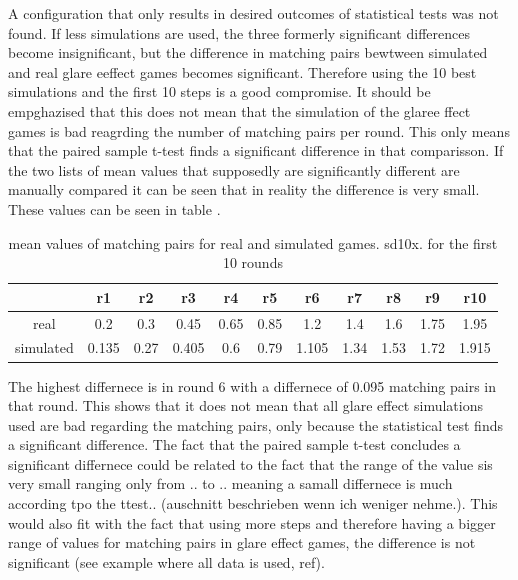 A configuration that only results in desired outcomes of statistical tests was not found. If less simulations are used, the three formerly significant differences become insignificant, but the difference in matching pairs bewtween simulated and real glare eeffect games becomes significant. Therefore using the 10 best simulations and the first 10 steps is a good compromise. It should be empghazised that this does not mean that the simulation of the glaree ffect games is bad reagrding the number of matching pairs per round. This only means that the paired sample t-test finds a significant difference in that comparisson. If the two lists of mean values that supposedly are significantly different are manually compared it can be seen that in reality the difference is very small. These values can be seen in table .

\begin{table}[H]
	\centering
	\caption{mean values of matching pairs for real and simulated games. sd10x. for the first 10 rounds}%
	\begin{tabular}{|c|c|c|c|c|c|c|c|c|c|c|}
		\hline
		& r1   &  r2  & r3 & r4   &  r5  & r6& r7   &  r8  & r9	&	r10\\
		\hline
	 	real&0.2 &0.3	&  0.45  &  0.65   &0.85 &  1.2   &    1.4 & 1.6 &  1.75 &1.95	\\
	 	\hline
	 	simulated&0.135 &0.27 &	0.405 &0.6  & 0.79 & 1.105& 1.34 & 1.53 & 1.72 & 1.915		\\
		\hline
	\end{tabular}
\end{table}

The highest differnece is in round 6 with a differnece of 0.095 matching pairs in that round. This shows that it does not mean that all glare effect simulations used are bad regarding the matching pairs, only because the statistical test finds a significant difference. The fact that the paired sample t-test concludes a significant differnece could be related to the fact that the range of the value sis very small ranging only from .. to .. meaning a samall differnece is much according tpo the ttest.. (auschnitt beschrieben wenn ich weniger nehme.). This would also fit with the fact that using more steps and therefore having a bigger range of values for matching pairs in glare effect games, the difference is not significant (see example where all data is used, ref).

